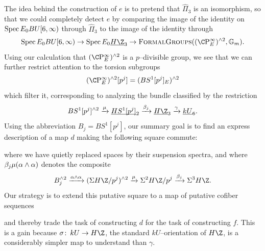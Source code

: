 The idea behind the construction of \(e\) is to pretend that \(\widehat \Pi_3\) is an isomorphism, so that we could completely detect \(e\) by comparing the image of the identity on \(\operatorname{Spec} E_0 BU[6, \infty)\) through \(\widehat \Pi_3\) to the image of the identity through \[\Spec E_0 BU[6, \infty) \to \Spec E_0 \OS{H\Z}{3} \to \CatOf{FormalGroups}((\CP^\infty_E)^{\sm 2}, \Gm).\]
Using our calculation that \((\CP^\infty_E)^{\sm 2}\) is a \(p\)--divisible group, we see that we can further restrict attention to the torsion subgroups \[(\CP^\infty_E)^{\sm 2}[p^j] = (BS^1[p^j]_E)^{\sm 2}\] which filter it, corresponding to analyzing the bundle classified by the restriction \[BS^1[p^j]^{\sm 2} \xrightarrow{\mu} \OS{HS^1[p^j]}{2} \xrightarrow{\beta_j} \OS{H\Z}{3} \xrightarrow{\gamma} \OS{kU}{6}.\]
Using the abbreviation \(B_j = BS^1[p^j]\), our summary goal is to find an express description of a map \(d\) making the following square commute:
\begin{center}
\end{center}
where we have quietly replaced spaces by their suspension spectra, and where \(\beta_j \mu(\alpha \wedge \alpha)\) denotes the composite \[B_j^{\sm 2} \xrightarrow{\alpha \sm \alpha} (\Susp H\Z/p^j)^{\sm 2} \xrightarrow{\mu} \Susp^2 H\Z/p^j \xrightarrow{\beta_j} \Susp^3 H\Z.\]
Our strategy is to extend this putative square to a map of putative cofiber sequences
\begin{center}
\end{center}
and thereby trade the task of constructing \(d\) for the task of constructing \(f\).
This is a gain because \(\sigma\co kU \to H\Z\), the standard \(kU\)--orientation of \(H\Z\), is a considerably simpler map to understand than \(\gamma\).

